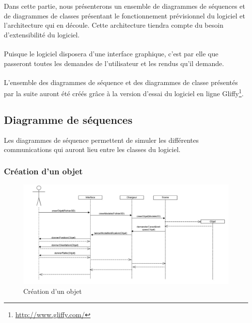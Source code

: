 Dans cette partie, nous présenterons un ensemble de diagrammes de séquences et de diagrammes de classes présentant le fonctionnement prévisionnel du logiciel et l’architecture qui en découle. Cette architecture tiendra compte du besoin d’extensibilité du logiciel.

\paragraph{}
Puisque le logiciel disposera d’une interface graphique, c’est par elle que passeront toutes les demandes de l’utilisateur et les rendus qu’il demande.

\paragraph{}
L’ensemble des diagrammes de séquence et des diagrammes de classe présentés par la suite auront été créés grâce à la version d’essai du logiciel en ligne Gliffy\footnote{\url{http://www.gliffy.com/}}.


\subsection{Diagramme de séquences}

Les diagrammes de séquence permettent de simuler les différentes communications qui auront lieu entre les classes du logiciel.

\subsubsection{Création d'un objet}

\begin{figure}[h]
		\centering
		\includegraphics[scale=0.4]{creerobjet.jpg}
		\caption{\label{fig:creerObjet} Création d'un objet}
\end{figure}

